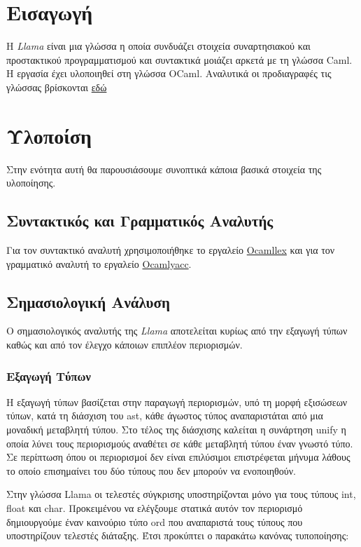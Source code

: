 \documentclass[12pt]{article}
\newcommand{\Llama}{\textit{Llama }}
\begin{document}
\section{Εισαγωγή}
H \Llama είναι μια γλώσσα η οποία συνδυάζει στοιχεία συναρτησιακού και προστακτικού προγραμματισμού και συντακτικά μοιάζει αρκετά με τη γλώσσα Caml. Η εργασία έχει υλοποιηθεί στη γλώσσα OCaml. Αναλυτικά οι προδιαγραφές τις γλώσσας βρίσκονται \href{http://courses.softlab.ntua.gr/compilers/2012a/llama2012.pdf}{εδώ}
\section{Υλοποίση}
Στην ενότητα αυτή θα παρουσιάσουμε συνοπτικά κάποια βασικά στοιχεία της υλοποίησης.
\subsection{Συντακτικός και Γραμματικός Αναλυτής}
Για τον συντακτικό αναλυτή χρησιμοποιήθηκε το εργαλείο \href{http://courses.softlab.ntua.gr/compilers/2012a/ocamlyacc-tutorial.pdf}{Ocamllex} και για τον γραμματικό     αναλυτή το εργαλείο \href{http://courses.softlab.ntua.gr/compilers/2012a/ocamlyacc-tutorial.pdf}{Ocamlyacc}.
\subsection{Σημασιολογική Ανάλυση}
Ο σημασιολογικός αναλυτής της \Llama αποτελείται κυρίως από την εξαγωγή τύπων καθώς και από τον έλεγχο κάποιων επιπλέον περιορισμών.
\subsubsection{Εξαγωγή Τύπων}
Η εξαγωγή τύπων βασίζεται στην παραγωγή περιορισμών, υπό τη μορφή εξισώσεων τύπων, κατά τη διάσχιση του ast, κάθε άγωστος τύπος αναπαριστάται από μια μοναδική μεταβλητή τύπου. Στο τέλος της διάσχισης καλείται η συνάρτηση unify η οποία λύνει τους περιορισμούς αναθέτει σε κάθε μεταβλητή τύπου έναν γνωστό τύπο. Σε περίπτωση όπου οι περιορισμοί δεν είναι επιλύσιμοι επιστρέφεται μήνυμα λάθους το οποίο επισημαίνει του δύο τύπους που δεν μπορούν να ενοποιηθούν.


Στην γλώσσα Llama οι τελεστές σύγκρισης υποστηρίζονται μόνο για τους τύπους int, float και char. Προκειμένου να ελέγξουμε στατικά αυτόν τον περιορισμό δημιουργούμε έναν καινούριο τύπο ord που αναπαριστά τους τύπους που υποστηρίζουν τελεστές διάταξης. Έτσι προκύπτει ο παρακάτω κανόνας τυποποίησης:
\end{document}

